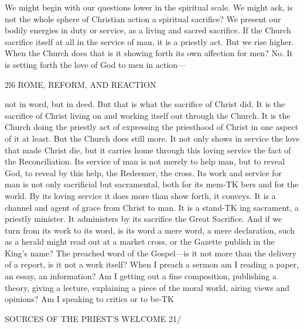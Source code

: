 \documentclass[12pt,a5paper,twoside]{book}
\begin{document}
{{We might begin with our questions lower in the 
spiritual scale. We might ask, is not the whole 
sphere of Christian action a spiritual sacrifice? We 
present our bodily energies in duty or service, as a 
living and sacred sacrifice. If the Church sacrifice 
itself at all in the service of man, it is a priestly act. 
But we rise higher. When the Church does that 
is it showing forth its own affection for men? No. 
It is setting forth the love of God to men in action---



2l6 ROME, REFORM, AND REACTION 

not in word, but in deed. But that is what the 
sacrifice of Christ did. It is the sacrifice of Christ 
living on and working itself out through the Church. 
It is the Church doing the priestly act of expressing 
the priesthood of Christ in one aspect of it at least. 
But the Church does still more. It not only shows 
in service the love that made Christ die, but it carries 
home through this loving service the fact of the 
Reconciliation. Its service of man is not merely to 
help man, but to reveal God, to reveal by this help, the 
Redeemer, the cross. Its work and service for man is 
not only sacrificial but sacramental, both for its mem-TK
bers and for the world. By its loving service it does 
more than show forth, it conveys. It is a channel 
and agent of grace from Christ to man. It is a stand-TK
ing sacrament, a priestly minister. It administers by 
its sacrifice the Great Sacrifice. And if we turn from 
its work to its word, is its word a mere word, a mere 
declaration, such as a herald might read out at a market 
cross, or the Gazette publish in the King's name? 
The preached word of the Gospel---is it not more 
than the delivery of a report, is it not a work itself? 
When I preach a sermon am I reading a paper, an 
essay, an information? Am I getting out a fine 
composition, publishing a theory, giving a lecture, 
explaining a piece of the moral world, airing views 
and opinions? Am I speaking to critics or to be-TK



SOURCES OF THE PRIEST'S WELCOME 21/ 

}}
\end{document}
